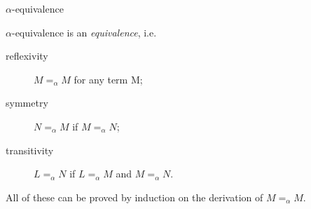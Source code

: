 \begin{frame}{$\alpha$-equivalence}
  \begin{definition}
  \begin{multicols}{2}
    \begin{prooftree}
    \end{prooftree}
    \begin{prooftree}
    \end{prooftree}
    \begin{prooftree}
    \end{prooftree}
    \begin{prooftree}
    \end{prooftree}
  \end{multicols}
\end{definition}

$\alpha$-equivalence is an \emph{equivalence}, i.e.
\begin{description}
  \item[reflexivity] $M =_\alpha M$ for any term M;
  \item[symmetry] $N =_\alpha M$ if $M =_\alpha N$;
  \item[transitivity] $L =_\alpha N$ if $L =_\alpha M$ and $M =_\alpha N$. 
\end{description}
All of these can be proved by induction on the derivation of $M =_\alpha M$.

\end{frame}

